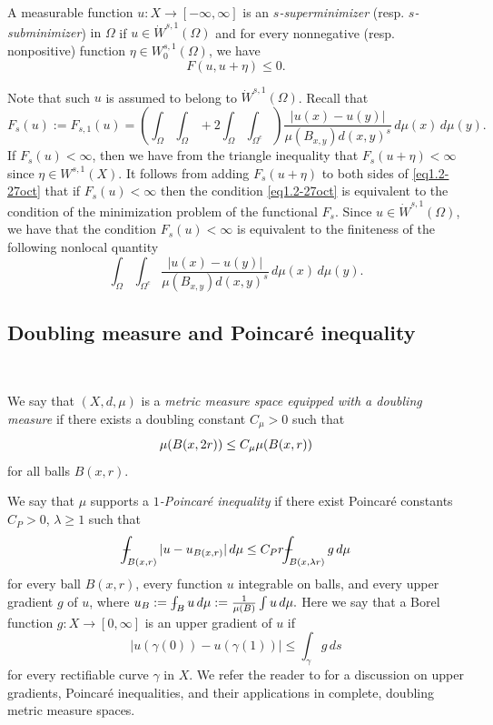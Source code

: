 \documentclass[11pt,leqno]{amsart}
\def\Xint#1{\mathchoice
	{\XXint\displaystyle\textstyle{#1}}
	{\XXint\textstyle\scriptstyle{#1}}
	{\XXint\scriptstyle\scriptscriptstyle{#1}}
	{\XXint\scriptscriptstyle\scriptscriptstyle{#1}}
	\!\int}
\def\XXint#1#2#3{{\setbox0=\hbox{$#1{#2#3}{\int}$ }
		\vcenter{\hbox{$#2#3$ }}\kern-.6\wd0}}
\def\dashint{\Xint-}
\numberwithin{equation}{section}
\theoremstyle{definition}
\begin{document}
	
	A measurable function $u:X\to[-\infty,\infty]$ is an \emph{$s$-superminimizer}
	(resp. \emph{$s$-subminimizer}) {in $\Omega$}
	if $u\in \dot W^{s,1}(\Omega)$ and for every nonnegative (resp. nonpositive)
	function $\eta\in W^{s,1}_0(\Omega)$, we have \begin{equation}\label{eq1.2-27oct}
		F(u,u+\eta)\leq 0.
	\end{equation}
	
	
	
	Note that such $u$ is assumed to belong to $\dot W^{s,1}(\Omega)$. Recall that 
	\[
	F_{s}(u):=F_{s,1}(u)= \left( \int_\Omega\int_\Omega +2\int_\Omega\int_{\Omega^c} \right) \frac{|u(x)-u(y)|}{\mu(B_{x,y})d(x,y)^s}\,d\mu(x)\,d\mu(y).
	\]
	If $F_{s}(u)<\infty$, then we have from the triangle inequality that $F_s(u+\eta)<\infty$ since $\eta\in W^{s,1}(X)$. It follows from adding $F_{s}(u+\eta)$ to both sides of \eqref{eq1.2-27oct} that if $F_s(u)<\infty$ then the condition \eqref{eq1.2-27oct} is equivalent to  the condition of the minimization problem of the functional $F_{s}$.
	Since $u\in \dot W^{s,1}(\Omega)$, we have that the condition  $F_s(u)<\infty$ is equivalent to the finiteness of the following nonlocal quantity
	\[
	\int_\Omega\int_{\Omega^c} \frac{|u(x)-u(y)|}{\mu(B_{x,y})d(x,y)^s}\,d\mu(x)\,d\mu(y).
	\]
	
	
	
	\subsection{Doubling measure and  Poincar\'e inequality}\
	\label{sec2.2}
	
	
	We say that $(X,d,\mu)$ is a \emph{metric measure space equipped with a doubling measure} if there exists a doubling constant $C_\mu>0$  such that
	\begin{equation}\notag
		\mu(B(x,2r))\leq C_\mu \mu(B(x,r)) 
	\end{equation}
	for all balls $B(x,r)$. 
	
	We say that  $\mu$ supports a \emph{$1$-Poincar\'e inequality} if there exist  Poincar\'e constants $C_P>0$,  $\lambda\ge1$ such that
	\begin{equation}\label{equ1.3-2011}\notag
		\dashint_{B(x,r)} |u - u_{B(x,r)}|\,d\mu
		\leq C_P r \dashint_{B(x,\lambda r)} g\, d\mu
	\end{equation}
	for every ball $B(x,r)$, every function $u$ integrable on balls, and every upper gradient $g$ of $u$, where $u_B:=\dashint_{B}u\, d\mu:=\frac{1}{\mu(B)}\int u\, d\mu.$
	Here we say that a Borel function $g:X\to[0,\infty]$ is an upper gradient of $u$ if 
	\[
	|u(\gamma(0))-u(\gamma(1))|\leq \int_\gamma g\, ds
	\]
	for every rectifiable curve $\gamma$ in $X$.
	We refer the reader to \cite{BB11,HKST15,Ha03,HK00,Sh00} for a discussion on upper gradients, Poincar\'e inequalities, and their applications in complete, doubling metric measure spaces. 
	
\end{document}
